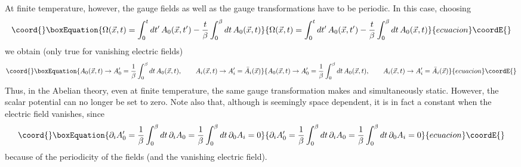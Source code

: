 \documentclass[a4paper,12pt]{article}
\begin{document}
At finite temperature, however, the gauge fields as well as the gauge
transformations have to be periodic. In this case, choosing
\begin{equation}\coord{}\boxEquation{
\Omega(\vec{x},t) = \int_{0}^{t} dt'\,A_{0}(\vec{x},t') - {t\over
\beta} \int_{0}^{\beta} dt\,A_{0}(\vec{x},t)
}{
\Omega(\vec{x},t) = \int_{0}^{t} dt'\,A_{0}(\vec{x},t') - {t\over
\beta} \int_{0}^{\beta} dt\,A_{0}(\vec{x},t)
}{ecuacion}\coordE{}\end{equation}
we obtain (only true for vanishing electric fields)
\begin{equation}\coord{}\boxEquation{
A_{0}(\vec{x},t)\rightarrow A'_{0}= {1\over \beta} \int_{0}^{\beta}
dt\,A_{0}(\vec{x},t),\qquad A_{i}(\vec{x},t)\rightarrow
 A'_{i} = \bar{A}_{i}(\vec{x})
}{
A_{0}(\vec{x},t)\rightarrow A'_{0}= {1\over \beta} \int_{0}^{\beta}
dt\,A_{0}(\vec{x},t),\qquad A_{i}(\vec{x},t)\rightarrow
 A'_{i} = \bar{A}_{i}(\vec{x})
}{ecuacion}\coordE{}\end{equation}
Thus, in the Abelian theory, even at finite temperature, the same
gauge transformation makes \coordHE{} and \coordHE{} simultaneously
static. However, the scalar potential can no longer be set to
zero. Note also that, although  \coordHE{}  is seemingly space
dependent, it is in fact a constant when the electric field vanishes,
since 
\begin{equation}\coord{}\boxEquation{
\partial_{i}A'_{0} = {1\over \beta}\int_{0}^{\beta}
dt\,\partial_{i}A_{0} = {1\over \beta} \int_{0}^{\beta}
dt\,\partial_{0}A_{i} = 0
}{
\partial_{i}A'_{0} = {1\over \beta}\int_{0}^{\beta}
dt\,\partial_{i}A_{0} = {1\over \beta} \int_{0}^{\beta}
dt\,\partial_{0}A_{i} = 0
}{ecuacion}\coordE{}\end{equation}
because of the periodicity of the fields (and the vanishing electric field).
\end{document}
